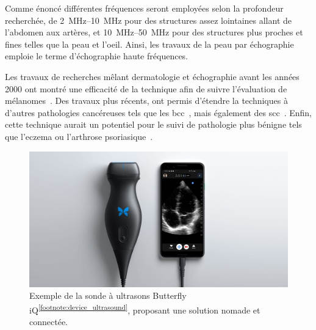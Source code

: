 Comme énoncé différentes fréquences seront employées selon la profondeur recherchée, de  \SIrange{2}{10}{\mega\hertz} pour des structures assez lointaines allant de l'abdomen aux artères, et \SIrange{10}{50}{\mega\hertz} pour des structures plus proches et fines telles que la peau et l'oeil. Ainsi, les travaux de la peau par échographie emploie le terme d'échographie haute fréquences.\par

Les travaux de recherches mêlant dermatologie et échographie avant les années 2000 ont montré une efficacité de la technique afin de suivre l'évaluation de mélanomes~\cite{Cammarota1998}. Des travaux plus récents, ont permis d'étendre la techniques à d'autres pathologies cancéreuses tels que les \gls{bcc}~\cite{Barcaui2014}, mais également des \gls{scc}~\cite{Catalano2010}. Enfin, cette technique aurait un potentiel pour le suivi de pathologie plus bénigne tels que l'eczema ou l'arthrose psoriasique~\cite{Bhatta2018}.\par

\begin{figure}[H]
    \centering
    \includegraphics[width=\linewidth]{contents/chapter_2/resources/exemple_ultrasound.jpg}
    \caption{Exemple de la sonde à ultrasons Butterfly iQ\textsuperscript{\ref{footnote:device_ultrasound}}, proposant une solution nomade et connectée.}
    \label{fig:exemple_ultrasound}
\end{figure}\par


\addtocounter{footnote}{1}
